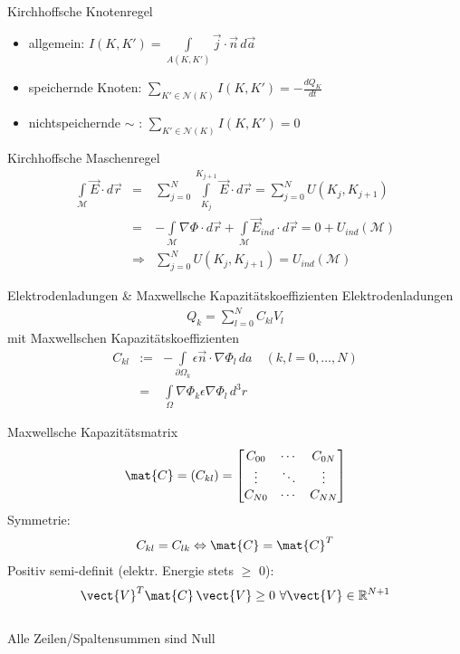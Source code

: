 \documentclass[a6paper]{kartei}
\begin{document}
\begin{karte}{Kirchhoffsche Knotenregel}
\begin{itemize}
\item allgemein: $I(K,K') = \int \limits_{A(K,K')} \vec{j} \cdot \vec{n} \, d\vec{a} $
\item speichernde Knoten: $\sum \limits_{K' \in \mathcal{N}(K)} I(K,K') = - \frac{dQ_{K}}{dt}$
\item nichtspeichernde $\sim$ : $\sum \limits_{K' \in \mathcal{N}(K)} I(K,K') = 0$
\end{itemize}
\end{karte}

\begin{karte}{Kirchhoffsche Maschenregel}
\begin{eqnarray*}
\int \limits_{\mathcal{M}} \vec{E} \cdot d\vec{r} & = &  \sum \limits_{j=0}^{N} \int \limits_{K_{j}}^{K_{j+1}} \vec{E} \cdot d\vec{r} = \sum \limits_{j=0}^{N} U(K_{j},K_{j+1}) \nonumber \\
& = & - \int \limits_{\mathcal{M}} \nabla \Phi \cdot d\vec{r} + \int \limits_{\mathcal{M}} \vec{E}_{ind} \cdot d\vec{r} = 0 + U_{ind}(\mathcal{M}) \nonumber \\
& \Rightarrow & \sum \limits_{j=0}^{N} U(K_{j},K_{j+1})  =  U_{ind}(\mathcal{M})
\end{eqnarray*}
\end{karte}

\begin{karte}{Elektrodenladungen \& Maxwellsche Kapazitätskoeffizienten}
Elektrodenladungen
 \begin{eqnarray*}
Q_{k} = \sum \limits_{l=0}^{N} C_{kl} V_{l}
\end{eqnarray*}
mit Maxwellschen Kapazitätskoeffizienten
\begin{eqnarray*}
C_{kl} & :=  & - \int \limits_{\partial \Omega_{k}} \epsilon \vec{n} \cdot \nabla \Phi_{l} \, da \quad (k,l = 0, \dots, N) \\
& = & \int \limits_{\Omega} \nabla \Phi_{k} \epsilon \nabla \Phi_{l} \, d^3r
\end{eqnarray*}
\end{karte}

\begin{karte}{Maxwellsche Kapazitätsmatrix}
\begin{eqnarray*}
\mat{C} = (C_{kl}) = \begin{bmatrix} C_{00} & \cdots & C_{0N} \\ \vdots & \ddots & \vdots \\ C_{N0} & \cdots & C_{NN} \end{bmatrix}
\end{eqnarray*}
Symmetrie:
\begin{eqnarray*}
C_{kl} = C_{lk} \Leftrightarrow \mat{C} = \mat{C}^{T}
\end{eqnarray*}
Positiv semi-definit (elektr. Energie stets $\geq$ 0):
\begin{eqnarray*}
 \vect{V}^{T} \mat{C}  \, \vect{V} \geq 0 \ \forall \vect{V} \in \mathbb{R}^{N+1}
\end{eqnarray*}
\\Alle Zeilen/Spaltensummen sind Null
\end{karte}
\end{document}
